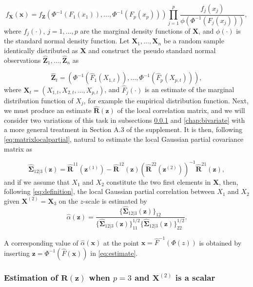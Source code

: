\documentclass[
  12pt,
  letterpaper]{article}
\newcommand{\X}{\bm{X}}
\newcommand{\Xtwo}{\bm{X}^{(2)}}
\newcommand{\x}{\bm{x}}
\newcommand{\Z}{\bm{Z}}
\newcommand{\z}{\bm{z}}
\newcommand{\hZ}{\widehat{\bm{Z}}}
\newcommand{\zone}{\bm{z}^{(1)}}
\newcommand{\ztwo}{\bm{z}^{(2)}}
\newcommand{\R}{\bm{R}}
\newcommand{\hR}{\widehat{\bm{R}}}
\newcommand{\hF}{\widehat{F}}
\newcommand{\hfSigma}{\widehat{\bm{\Sigma}}}
\newcommand{\halpha}{\widehat{\alpha}}
\theoremstyle{definition}
\theoremstyle{definition}
\theoremstyle{definition}
\theoremstyle{remark}
\begin{document}
\begin{equation}
f_{\X}(\x) = f_{\Z}\left(\Phi^{-1}\left(F_1(x_1)\right), \ldots, \Phi^{-1}\left(F_p(x_p)\right)\right)\prod_{j=1}^p 
\frac{f_j(x_j)}{\phi\left(\Phi^{-1}\left(F_j(x_j)\right)\right)},
\label{eq:fxfz}
\end{equation}
where \(f_j(\cdot)\), \(j = 1,\ldots, p\) are the marginal density functions of \(\X\), and \(\phi(\cdot)\) is the standard normal density function. Let \(\X_1, \ldots, \X_n\) be a random sample identically distributed as \(\X\) and construct the pseudo standard normal observations \(\hZ_1, \ldots, \hZ_n\) as

\begin{equation}
\hZ_t = \left(\Phi^{-1}\left(\hF_1(X_{1,t})\right), \ldots, \Phi^{-1}\left(\hF_p(X_{p,t})\right)\right),
\label{eq:pseudoobservations}
\end{equation}
where \(\X_t = (X_{1,t}, X_{2,t}, \ldots, X_{p,t})\), and \(\hF_j(\cdot)\) is an estimate of the marginal distribution function of \(X_j\), for example the empirical distribution function. Next, we must produce an estimate \(\hR(\z)\) of the local correlation matrix, and we will consider two variations of this task in subsections \ref{chap:trivariate-full} and \ref{chap:bivariate} with a more general treatment in Section A.3 of the supplement. It is then, following \eqref{eq:matrixlocalpartial}, natural to estimate the local Gaussian partial covariance matrix as

\begin{equation}
\hfSigma_{12|3}(\z) = \hR^{11}(\zone) -  \hR^{12}(\z)\left(\hR^{22}(\ztwo)\right)^{-1}\hR^{21}(\z),
\label{eq:localpartialcov}
\end{equation}
and if we assume that \(X_1\) and \(X_2\) constitute the two first elements in \(\X\), then, following \eqref{eq:definition}, the local Gaussian partial correlation between \(X_1\) and \(X_2\) given \(\Xtwo = \X_3\) on the \(z\)-scale is estimated by
\begin{equation}
\widehat\alpha(\z) = \frac{\Big\{\hfSigma_{12|3}(\z)\Big\}_{12}}{\Big\{\hfSigma_{12|3}(\z)\Big\}_{11}^{1/2}\Big\{\hfSigma_{12|3}(\z)\Big\}_{22}^{1/2}}.
\label{eq:estimate}
\end{equation}

A corresponding value of \(\halpha(\x)\) at the point \(\x = \widehat F^{-1}(\Phi(z))\) is obtained by inserting \(\z = \Phi^{-1}(\widehat F(\x))\) in \eqref{eq:estimate}.

\hypertarget{chap:trivariate-full}{%
\subsubsection{\texorpdfstring{Estimation of \(\R(\z)\) when \(p = 3\) and \(\Xtwo\) is a scalar}{Estimation of \textbackslash R(\textbackslash z) when p = 3 and \textbackslash Xtwo is a scalar}}\label{chap:trivariate-full}}
\end{document}
